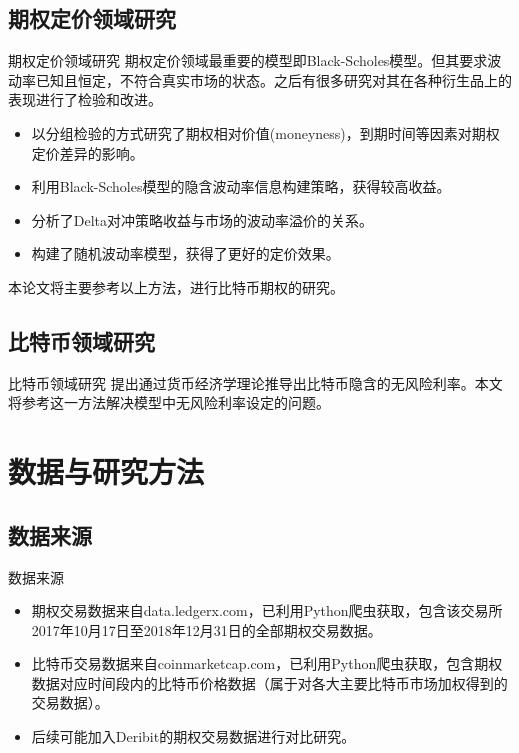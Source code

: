 \documentclass[11pt,dark]{mathbeamer}
\begin{document}
\subsection{期权定价领域研究}
\begin{frame}{期权定价领域研究}
  期权定价领域最重要的模型即Black-Scholes模型\cite{Fische-1973}。但其要求波动率已知且恒定，不符合真实市场的状态。之后有很多研究对其在各种衍生品上的表现进行了检验和改进。
  \begin{itemize}
    \item {}以分组检验的方式研究了期权相对价值(moneyness)，到期时间等因素对期权定价差异的影响。
    \item {}利用Black-Scholes模型的隐含波动率信息构建策略，获得较高收益。
    \item {} 分析了Delta对冲策略收益与市场的波动率溢价的关系。
    \item {} 构建了随机波动率模型，获得了更好的定价效果。
  \end{itemize}
  本论文将主要参考以上方法，进行比特币期权的研究。
\end{frame}

\subsection{比特币领域研究}
\begin{frame}{比特币领域研究}
   提出通过货币经济学理论推导出比特币隐含的无风险利率。本文将参考这一方法解决模型中无风险利率设定的问题。
\end{frame}
\section{数据与研究方法}
\subsection{数据来源}
\begin{frame}{数据来源}
  \begin{itemize}
    \item 期权交易数据来自data.ledgerx.com，已利用Python爬虫获取，包含该交易所2017年10月17日至2018年12月31日的全部期权交易数据。
    \item 比特币交易数据来自coinmarketcap.com，已利用Python爬虫获取，包含期权数据对应时间段内的比特币价格数据（属于对各大主要比特币市场加权得到的交易数据）。
    \item 后续可能加入Deribit的期权交易数据进行对比研究。
  \end{itemize}
\end{frame}
\end{document}
